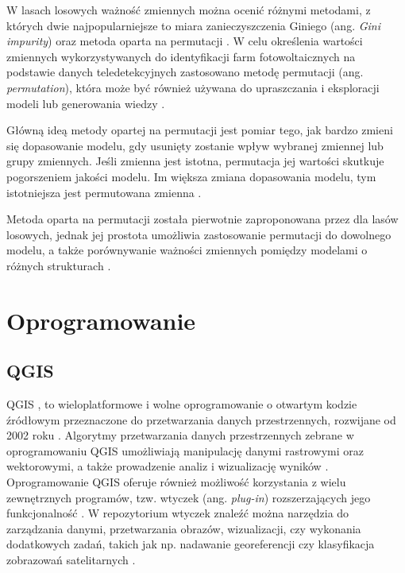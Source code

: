 \documentclass{amuthesis}
\begin{document}
W lasach losowych ważność zmiennych można ocenić różnymi metodami, z
których dwie najpopularniejsze to miara zanieczyszczenia Giniego (ang.
\emph{Gini impurity}) oraz metoda oparta na permutacji
\autocite{R-Przewodnik}. W celu określenia wartości zmiennych
wykorzystywanych do identyfikacji farm fotowoltaicznych na podstawie
danych teledetekcyjnych zastosowano metodę permutacji (ang.
\emph{permutation}), która może być również używana do upraszczania i
eksploracji modeli lub generowania wiedzy
\autocite{biecek_2021_model_analysis}.

Główną ideą metody opartej na permutacji jest pomiar tego, jak bardzo
zmieni się dopasowanie modelu, gdy usunięty zostanie wpływ wybranej
zmiennej lub grupy zmiennych. Jeśli zmienna jest istotna, permutacja jej
wartości skutkuje pogorszeniem jakości modelu. Im większa zmiana
dopasowania modelu, tym istotniejsza jest permutowana zmienna
\autocite{biecek_2021_model_analysis}.

Metoda oparta na permutacji została pierwotnie zaproponowana przez
\textcite{breiman_2001_rf} dla lasów losowych, jednak jej prostota
umożliwia zastosowanie permutacji do dowolnego modelu, a także
porównywanie ważności zmiennych pomiędzy modelami o różnych strukturach
\autocite{biecek_2021_model_analysis}.

\hypertarget{oprogramowanie}{%
\section{Oprogramowanie}\label{oprogramowanie}}

\hypertarget{qgis}{%
\subsection{QGIS}\label{qgis}}

QGIS \autocite{qgis}, to wieloplatformowe i wolne oprogramowanie o
otwartym kodzie źródłowym przeznaczone do przetwarzania danych
przestrzennych, rozwijane od 2002 roku
\autocite{hejmanowska_2020_dane,flenniken_2020_qgis}. Algorytmy
przetwarzania danych przestrzennych zebrane w oprogramowaniu QGIS
umożliwiają manipulację danymi rastrowymi oraz wektorowymi, a także
prowadzenie analiz i wizualizację wyników
\autocite{hejmanowska_2020_dane}. Oprogramowanie QGIS oferuje również
możliwość korzystania z wielu zewnętrznych programów, tzw. wtyczek (ang.
\emph{plug-in}) rozszerzających jego funkcjonalność
\autocite{hejmanowska_2020_dane}. W repozytorium wtyczek znaleźć można
narzędzia do zarządzania danymi, przetwarzania obrazów, wizualizacji,
czy wykonania dodatkowych zadań, takich jak np. nadawanie georeferencji
czy klasyfikacja zobrazowań satelitarnych
\autocite{hejmanowska_2020_dane}.
\end{document}
